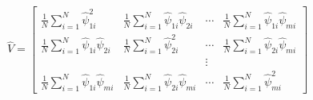 \documentclass[12pt]{article}
\begin{document}
\begin{align*}
	\hat{V} = 
	\begin{bmatrix}
	\frac{1}{N}\sum_{i=1}^N \hat{\psi}_{1i}^2 	& \frac{1}{N}\sum_{i=1}^N \hat{\psi}_{1i}\hat{\psi}_{2i} & \cdots & \frac{1}{N}\sum_{i=1}^N \hat{\psi}_{1i}\hat{\psi}_{mi} \\
	\frac{1}{N}\sum_{i=1}^N \hat{\psi}_{1i}\hat{\psi}_{2i} & \frac{1}{N}\sum_{i=1}^N \hat{\psi}_{2i}^2 	& \cdots  & \frac{1}{N}\sum_{i=1}^N \hat{\psi}_{2i}\hat{\psi}_{mi} \\
	&			  	  &	\vdots & \\
	\frac{1}{N}\sum_{i=1}^N \hat{\psi}_{1i}\hat{\psi}_{mi} & \frac{1}{N}\sum_{i=1}^N \hat{\psi}_{2i}\hat{\psi}_{mi} & \cdots & \frac{1}{N}\sum_{i=1}^N \hat{\psi}_{mi}^2
	\end{bmatrix}
\end{align*}
\end{document}
